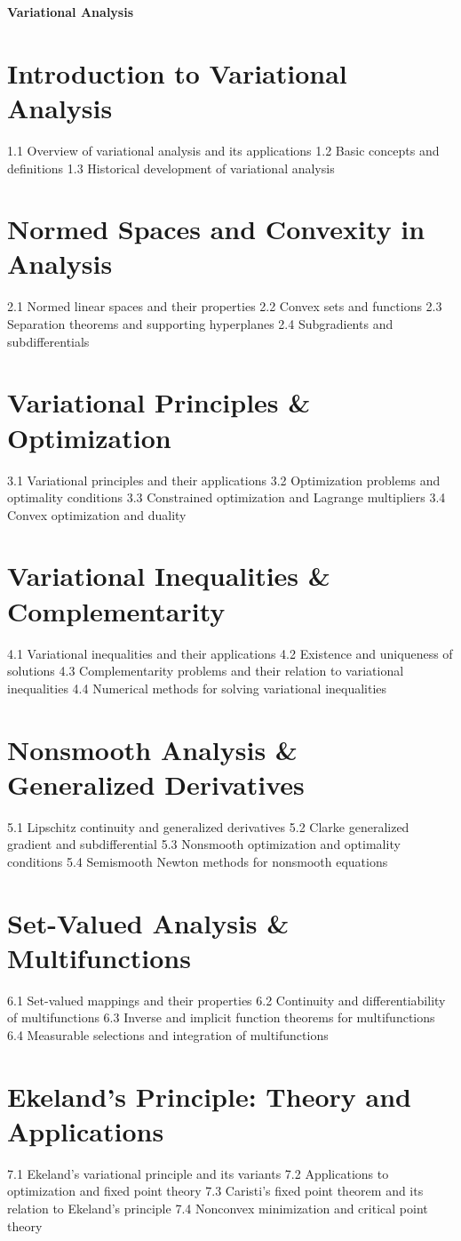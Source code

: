 {\LARGE \bf{Variational Analysis}}
\section{Introduction to Variational Analysis}
1.1 Overview of variational analysis and its applications
1.2 Basic concepts and definitions
1.3 Historical development of variational analysis
\section{Normed Spaces and Convexity in Analysis}
2.1 Normed linear spaces and their properties
2.2 Convex sets and functions
2.3 Separation theorems and supporting hyperplanes
2.4 Subgradients and subdifferentials
\section{Variational Principles \& Optimization}
3.1 Variational principles and their applications
3.2 Optimization problems and optimality conditions
3.3 Constrained optimization and Lagrange multipliers
3.4 Convex optimization and duality
\section{Variational Inequalities \& Complementarity}
4.1 Variational inequalities and their applications
4.2 Existence and uniqueness of solutions
4.3 Complementarity problems and their relation to variational inequalities
4.4 Numerical methods for solving variational inequalities
\section{Nonsmooth Analysis \& Generalized Derivatives}
5.1 Lipschitz continuity and generalized derivatives
5.2 Clarke generalized gradient and subdifferential
5.3 Nonsmooth optimization and optimality conditions
5.4 Semismooth Newton methods for nonsmooth equations
\section{Set-Valued Analysis \& Multifunctions}
6.1 Set-valued mappings and their properties
6.2 Continuity and differentiability of multifunctions
6.3 Inverse and implicit function theorems for multifunctions
6.4 Measurable selections and integration of multifunctions
\section{Ekeland's Principle: Theory and Applications}
7.1 Ekeland's variational principle and its variants
7.2 Applications to optimization and fixed point theory
7.3 Caristi's fixed point theorem and its relation to Ekeland's principle
7.4 Nonconvex minimization and critical point theory
